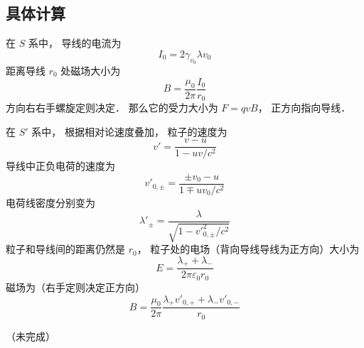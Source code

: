 \subsection{具体计算}
在 $S$ 系中， 导线的电流为
\begin{equation}
I_0 = 2 \gamma_{v_0}\lambda v_0
\end{equation}
距离导线 $r_0$ 处磁场大小为
\begin{equation}
B = \frac{\mu_0}{2\pi} \frac{I_0}{r_0}
\end{equation}
方向右右手螺旋定则决定． 那么它的受力大小为 $F = q v B$， 正方向指向导线．

在 $S'$ 系中， 根据相对论速度叠加， 粒子的速度为
\begin{equation}
v' = \frac{v - u}{1 - uv/c^2}
\end{equation}
导线中正负电荷的速度为
\begin{equation}
v'_{0, \pm} = \frac{\pm v_0-u}{1 \mp uv_0/c^2}
\end{equation}
电荷线密度分别变为
\begin{equation}
\lambda'_\pm = \frac{\lambda}{\sqrt{1 - v'^2_{0,\pm}/c^2}}
\end{equation}
粒子和导线间的距离仍然是 $r_0$， 粒子处的电场（背向导线导线为正方向）大小为
\begin{equation}
E = \frac{\lambda_+ + \lambda_-}{2 \pi \varepsilon_{0} r_0}
\end{equation}
磁场为（右手定则决定正方向）
\begin{equation}
B = \frac{\mu_0}{2\pi} \frac{\lambda_+ v'_{0,+} + \lambda_- v'_{0,-}}{r_0}
\end{equation}


（未完成）

